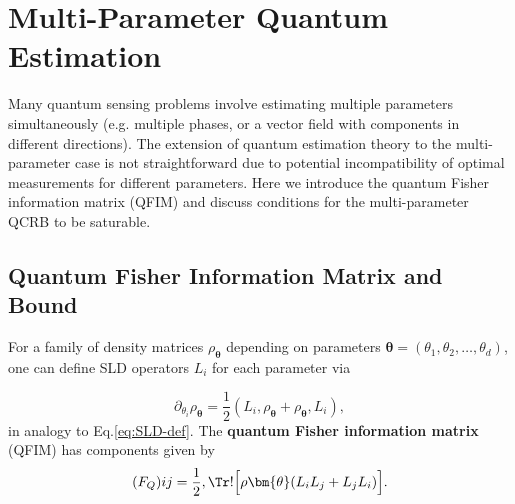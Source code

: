 \section{Multi-Parameter Quantum Estimation}

\label{sec:multiparam}



Many quantum sensing problems involve estimating multiple parameters
simultaneously (e.g. multiple phases, or a vector field with
components in different directions). The extension of quantum
estimation theory to the multi-parameter case is not straightforward
due to potential incompatibility of optimal measurements for different
parameters. Here we introduce the quantum Fisher information matrix
(QFIM) and discuss conditions for the multi-parameter QCRB to be
saturable.



\subsection{Quantum Fisher Information Matrix and Bound}



For a family of density matrices $\rho_{\bm{\theta}}$ depending on
parameters $\bm{\theta} = (\theta_1,\theta_2,\ldots,\theta_d)$, one
can define SLD operators $L_i$ for each parameter via

\begin{equation}
\partial_{\theta_i} \rho_{\bm{\theta}} = \frac{1}{2}(L_i,\rho_{\bm{\theta}} + \rho_{\bm{\theta}},L_i),
\end{equation}
in analogy to Eq.\eqref{eq:SLD-def}. The \textbf{quantum Fisher information matrix} (QFIM) has components given by
\begin{equation}
(F_Q){ij} = \frac{1}{2}, \Tr!\Big[\rho{\bm{\theta}} (L_i L_j + L_j L_i)\Big].
\label{eq:QFIM-def}
\end{equation}

